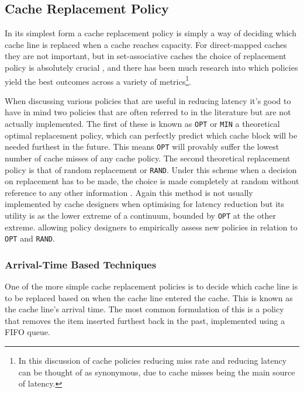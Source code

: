 \subsection{Cache Replacement Policy}
\label{sec:replacement_policy}

In its simplest form a cache replacement policy is simply a way of deciding which cache line is replaced when a cache reaches capacity. For direct-mapped caches they are not important, but in set-associative caches the choice of replacement policy is absolutely crucial \cite{hennessyComputerArchitectureQuantitative2019}, and there has been much research into which policies yield the best outcomes across a variety of metrics\footnote{In this discussion of cache policies reducing miss rate and reducing latency can be thought of as synonymous, due to cache misses being the main source of latency.}.

When discussing various policies that are useful in reducing latency it's good to have in mind two policies that are often referred to in the literature but are not actually implemented. The first of these is known as \texttt{OPT} or \texttt{MIN} \cite{jeongOptimalReplacementsCaches1999} a theoretical optimal replacement policy, which can perfectly predict which cache block will be needed furthest in the future. This means \texttt{OPT} will provably suffer the lowest number of cache misses of any cache policy. The second theoretical replacement policy is that of random replacement or \texttt{RAND}. Under this scheme when a decision on replacement has to be made, the choice is made completely at random without reference to any other information \cite{beladyStudyReplacementAlgorithms1966}. Again this method is not usually implemented by cache designers when optimising for latency reduction \cite{karedlaCachingStrategiesImprove1994} but its utility is as the lower extreme of a continuum, bounded by \texttt{OPT} at the other extreme. allowing policy designers to empirically assess new policies in relation to \texttt{OPT} and \texttt{RAND}.

\subsubsection{Arrival-Time Based Techniques}

One of the more simple cache replacement policies is to decide which cache line is to be replaced based on when the cache line entered the cache. This is known as the cache line's arrival time. The most common formulation of this is a policy that removes the item inserted furthest back in the past, implemented using a FIFO queue.

